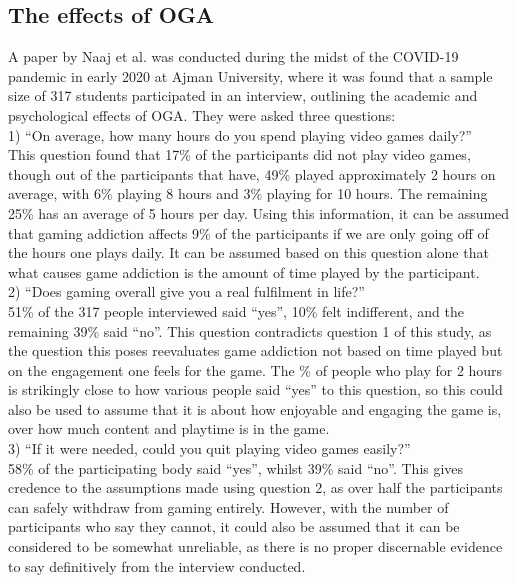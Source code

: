 \documentclass[conference]{IEEEtran}
\begin{document}
\subsection{The effects of OGA}
A paper by Naaj et al.\cite{Naaj2021} was conducted during the midst of the COVID-19 pandemic in early 2020 at Ajman University, where it was found that a sample size of 317 students participated in an interview, outlining the academic and psychological effects of OGA. They were asked three questions: \\

1) “On average, how many hours do you spend playing video games daily?”\\

This question found that 17\% of the participants did not play video games, though out of the participants that have, 49\% played approximately 2 hours on average, with 6\% playing 8 hours and 3\% playing for 10 hours. The remaining 25\% has an average of 5 hours per day. Using this information, it can be assumed that gaming addiction affects 9\% of the participants if we are only going off of the hours one plays daily. It can be assumed based on this question alone that what causes game addiction is the amount of time played by the participant.\\

2) “Does gaming overall give you a real fulfilment in life?”\\

51\% of the 317 people interviewed said “yes”, 10\% felt indifferent, and the remaining 39\% said “no”. This question contradicts question 1 of this study, as the question this poses reevaluates game addiction not based on time played but on the engagement one feels for the game. The \% of people who play for 2 hours is strikingly close to how various people said “yes” to this question, so this could also be used to assume that it is about how enjoyable and engaging the game is, over how much content and playtime is in the game.\\

3) “If it were needed, could you quit playing video games easily?”\\

58\% of the participating body said “yes”, whilst 39\% said “no”. This gives credence to the assumptions made using question 2, as over half the participants can safely withdraw from gaming entirely. However, with the number of participants who say they cannot, it could also be assumed that it can be considered to be somewhat unreliable, as there is no proper discernable evidence to say definitively from the interview conducted.\\
\end{document}

